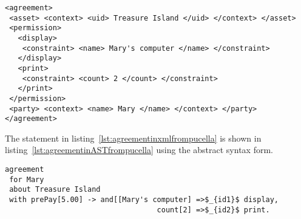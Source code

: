 \lstset{language=XML}
\begin{minipage}[c]{0.95\textwidth}
\begin{lstlisting}[caption={Agreement for Alice and Bob in XML~\cite{pucella2006}}, label={lst:agreementinxmlfrompucella}]
<agreement>
 <asset> <context> <uid> Treasure Island </uid> </context> </asset>
 <permission>
   <display>
    <constraint> <name> Mary's computer </name> </constraint>
   </display>
   <print>
    <constraint> <count> 2 </count> </constraint>
   </print>
 </permission>
 <party> <context> <name> Mary </name> </context> </party>
</agreement>
\end{lstlisting}
\end{minipage} 

The statement in listing~\ref{lst:agreementinxmlfrompucella} is shown in listing~\ref{lst:agreementinASTfrompucella} using the abstract syntax form.

\lstset{language=Pucella2006}
\begin{minipage}[c]{0.95\textwidth}
\begin{lstlisting}[frame=single, caption={Agreement for Alice and Bob~\cite{pucella2006}}, label={lst:agreementinASTfrompucella}, mathescape]
agreement
 for Mary 
 about Treasure Island 
 with prePay[5.00] -> and[[Mary's computer] =>$_{id1}$ display, 
                                   count[2] =>$_{id2}$ print.
\end{lstlisting}
\end{minipage} 




